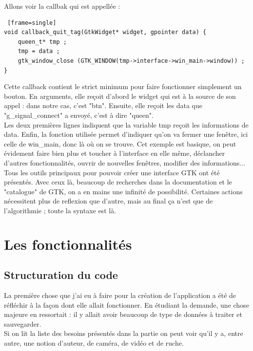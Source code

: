 \documentclass[11pt,french,a4paper]{report}
\begin{document}
Allons voir la callbak qui est appellée : 
\begin{lstlisting} [frame=single]
void callback_quit_tag(GtkWidget* widget, gpointer data) {                                       
    queen_t* tmp ;                                                                             
    tmp = data ;                                                                                
    gtk_window_close (GTK_WINDOW(tmp->interface->win_main->window)) ; 
} 
\end{lstlisting}
Cette callback contient le strict minimum pour faire fonctionner simplement un bouton.
En arguments, elle reçoit d'abord le widget qui est à la source de son appel : dans notre cas, c'est "btn". 
Ensuite, elle reçoit les data que "g\_signal\_connect" a envoyé, c'est à dire "queen". \\

Les deux premières lignes indiquent que la variable tmp reçoit les informations de data. 
Enfin, la fonction utilisée permet d'indiquer qu'on va fermer une fenêtre, ici celle de win\_main, donc là où on
se trouve. Cet exemple est basique, on peut évidement faire bien plus et toucher à l'interface en elle même, déclancher
d'autres fonctionnalités, ouvrir de nouvelles fenêtres, modifier des informations...\\

Tous les outils principaux pour pouvoir créer une interface GTK ont été présentés. Avec ceux là, beaucoup de recherches
dans la documentation et le "catalogue" %
de GTK, on a en mains une infinité de possibilité. Certaines actions nécessitent plus de reflexion que d'autre, mais 
au final ça n'est que de l'algorithmie ; toute la syntaxe est là. \\


    \section{Les fonctionnalités} 
        \subsection{Structuration du code}
La première chose que j'ai eu à faire pour la création de l'application a été de réfléchir à la façon dont elle allait fonctionner.
En étudiant la demande, une chose majeure en ressortait : il y allait avoir beaucoup de type de données à traiter et sauvegarder. \\
Si on lit la liste des besoins présentés dans la partie %
on peut voir qu'il y a, entre autre, une notion d'auteur, de caméra, de vidéo et de ruche.
\end{document}
